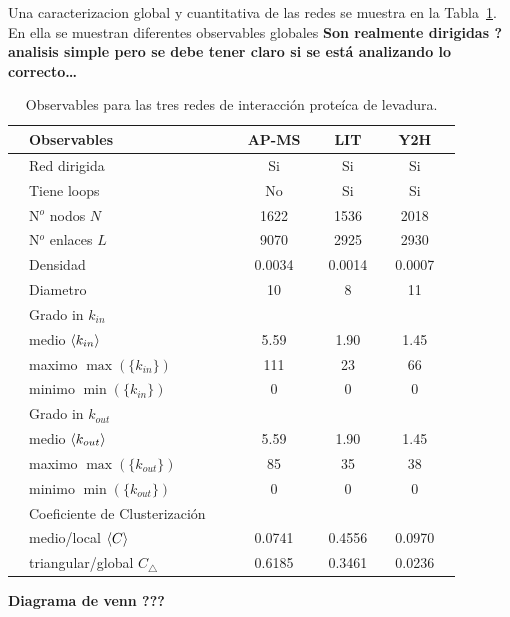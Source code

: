 Una caracterizacion global y cuantitativa de las redes se muestra en la 
Tabla~\ref{tab:obs}. En ella se muestran diferentes observables globales
\textbf{Son realmente dirigidas ? analisis simple pero se debe tener claro
si se est\'a analizando lo correcto\ldots}
\begin{table}[!ht]
    \centering
    {\scriptsize
    \begin{tabularx}{1\columnwidth}{XlX|XcXcXcX}
        \hline\hline
        &Observables        &&& AP-MS && LIT && Y2H &\\ 
        \hline
        &Red dirigida       &&& Si && Si && Si &\\
        &Tiene loops        &&& No && Si && Si &\\
        &N$^o$ nodos $N$    &&& 1622 && 1536 && 2018 &\\
        &N$^o$ enlaces $L$  &&& 9070 && 2925 && 2930 &\\
        &Densidad           &&& 0.0034 && 0.0014 && 0.0007 &\\
        &Diametro           &&& 10 && 8 && 11 &\\
        \hline
        &Grado in $k_{in}$&&&\\
        &\quad medio  $\left\langle k_{in}\right\rangle$     &&& 5.59 && 1.90 && 1.45 &\\
        &\quad maximo $\max(\{k_{in}\})$  &&& 111  && 23   && 66 &\\ 
        &\quad minimo $\min(\{k_{in}\})$  &&& 0    && 0    && 0 &\\ 
        \hline
        &Grado in $k_{out}$&&&\\
        &\quad medio  $\left\langle k_{out}\right\rangle$     &&& 5.59 && 1.90 && 1.45 &\\
        &\quad maximo $\max(\{k_{out}\})$  &&& 85   && 35   && 38   &\\ 
        &\quad minimo $\min(\{k_{out}\})$  &&& 0    && 0    && 0    &\\ 
        \hline
        &Coeficiente de Clusterizaci\'on&&&\\
        &\quad medio/local $\left\langle C\right\rangle$               &&& 0.0741 && 0.4556 && 0.0970 & \\
        &\quad triangular/global $C_\bigtriangleup$ &&& 0.6185 && 0.3461 && 0.0236 & \\
        \hline\hline
    \end{tabularx}
    }
    \caption{\label{tab:obs}Observables para las tres redes de interacci\'on prote\'ica de levadura.}
\end{table}
        
    
\textbf{Diagrama de venn ???}
